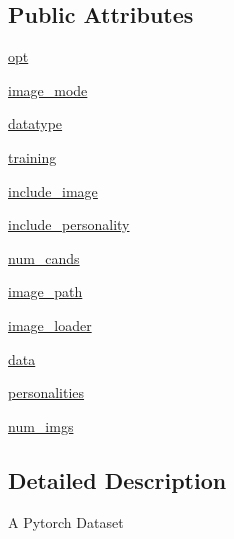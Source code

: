\subsection*{Public Attributes}
\begin{DoxyCompactItemize}
\item 
\hyperlink{classparlai_1_1tasks_1_1image__chat_1_1agents_1_1DefaultDataset_a14a912c6b7293b439de09f085fd8e34b}{opt}
\item 
\hyperlink{classparlai_1_1tasks_1_1image__chat_1_1agents_1_1DefaultDataset_ae429b8f3c79618de545845c21e098e63}{image\+\_\+mode}
\item 
\hyperlink{classparlai_1_1tasks_1_1image__chat_1_1agents_1_1DefaultDataset_aaa468ef7ff87d1502be666ce690ab030}{datatype}
\item 
\hyperlink{classparlai_1_1tasks_1_1image__chat_1_1agents_1_1DefaultDataset_a2419786bfafc52743cd7a551a5bad7d1}{training}
\item 
\hyperlink{classparlai_1_1tasks_1_1image__chat_1_1agents_1_1DefaultDataset_a3efeafee8792c6e993c00b2efd0e0105}{include\+\_\+image}
\item 
\hyperlink{classparlai_1_1tasks_1_1image__chat_1_1agents_1_1DefaultDataset_a0533c75ec1506750cb33452cdd9ce6ab}{include\+\_\+personality}
\item 
\hyperlink{classparlai_1_1tasks_1_1image__chat_1_1agents_1_1DefaultDataset_ac67c813f8e7d7136f9fdf7f5f5c2f149}{num\+\_\+cands}
\item 
\hyperlink{classparlai_1_1tasks_1_1image__chat_1_1agents_1_1DefaultDataset_aedd4071dfb52d895e871da214dddb025}{image\+\_\+path}
\item 
\hyperlink{classparlai_1_1tasks_1_1image__chat_1_1agents_1_1DefaultDataset_acd123d24d3b3517fb29b0623919be085}{image\+\_\+loader}
\item 
\hyperlink{classparlai_1_1tasks_1_1image__chat_1_1agents_1_1DefaultDataset_a43bdb2cf4b79d988fd5043f85d39af45}{data}
\item 
\hyperlink{classparlai_1_1tasks_1_1image__chat_1_1agents_1_1DefaultDataset_a823a0d9ee64ca85730374c1a944ed789}{personalities}
\item 
\hyperlink{classparlai_1_1tasks_1_1image__chat_1_1agents_1_1DefaultDataset_affc03098db06accb5c4efb0854e6cc42}{num\+\_\+imgs}
\end{DoxyCompactItemize}


\subsection{Detailed Description}
\begin{DoxyVerb}A Pytorch Dataset\end{DoxyVerb}
 

